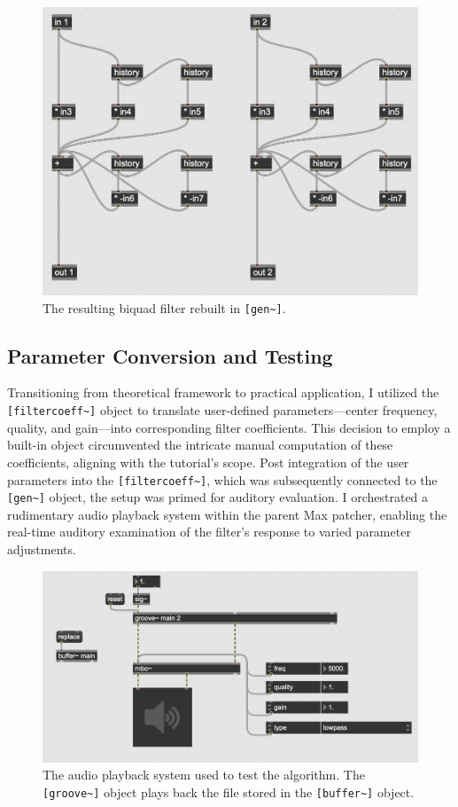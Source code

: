\documentclass[10pt,twocolumn]{article}
\begin{document}
\begin{figure}[htbp]
  \centering
  \includegraphics[width=0.8\linewidth]{biquadgen.png}
  \caption{The resulting biquad filter rebuilt in \texttt{[gen\textasciitilde]}.}
  \label{fig:biquadgen}
\end{figure}

\subsection{Parameter Conversion and Testing}
Transitioning from theoretical framework to practical application, I utilized the \texttt{[filtercoeff\textasciitilde]} object to translate user-defined parameters—center frequency, quality, and gain—into corresponding filter coefficients. This decision to employ a built-in object circumvented the intricate manual computation of these coefficients, aligning with the tutorial's scope. Post integration of the user parameters into the \texttt{[filtercoeff\textasciitilde]}, which was subsequently connected to the \verb|[gen~]| object, the setup was primed for auditory evaluation. I orchestrated a rudimentary audio playback system within the parent Max patcher, enabling the real-time auditory examination of the filter's response to varied parameter adjustments.

\begin{figure}[htbp]
  \centering
  \includegraphics[width=0.8\linewidth]{audioplayback.png}
  \caption{The audio playback system used to test the algorithm. The \texttt{[groove\textasciitilde]} object plays back the file stored in the \texttt{[buffer\textasciitilde]} object.}
  \label{fig:playback}
\end{figure}
\end{document}
